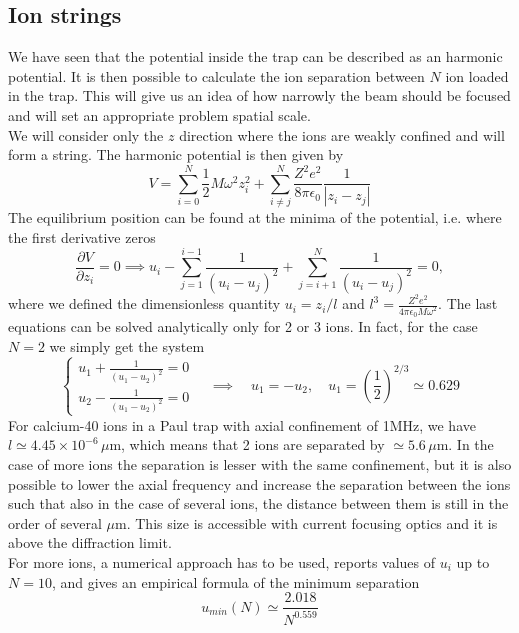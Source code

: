 \subsection{Ion strings}
We have seen that the potential inside the trap can be described as an harmonic potential. It is then possible to calculate the ion separation between $N$ ion loaded in the trap. This will give us an idea of how narrowly the beam should be focused and will set an appropriate problem spatial scale.\\
We will consider only the $z$ direction where the ions are weakly confined and will form a string. The harmonic potential is then given by
\begin{equation}
V = \sum_{i=0}^N \frac{1}{2}M\omega^2z_i^2 + \sum_{i\neq j}^N\frac{Z^2e^2}{8\pi \epsilon_0}\frac{1}{|z_i-z_j|}
\end{equation}
The equilibrium position can be found at the minima of the potential, i.e. where the first derivative zeros
\begin{equation}
\frac{\partial V}{\partial z_i} = 0 \implies u_i - \sum_{j=1}^{i-1} \frac{1}{(u_i-u_j)^2} + \sum_{j= i+1}^{N} \frac{1}{(u_i-u_j)^2}= 0,
\end{equation}
where we defined the dimensionless quantity $u_i = z_i/l$ and $l^3 = \displaystyle\frac{Z^2 e^2 }{4\pi \epsilon_0 M\omega^2}$.
The last equations can be solved analytically only for 2 or 3 ions. In fact, for the case $N=2$ we simply get the system
\begin{equation}
\begin{cases}
  u_1 + \frac{1}{(u_1-u_2)^2} = 0\\
  u_2 - \frac{1}{(u_1-u_2)^2} = 0
  \end{cases} \quad \implies \quad u_1 = -u_2,\quad  u_1 = \left(\frac{1}{2}\right)^{2/3} \simeq 0.629
\end{equation}
For calcium-40 ions in a Paul trap with axial confinement of 1MHz, we have $l \simeq 4.45\times 10^{-6}\, \mu$m, which means that 2 ions are separated by $\simeq 5.6\, \mu$m. In the case of more ions the separation is lesser with the same confinement, but it is also possible to lower the axial frequency and increase the separation between the ions such that also in the case of several ions, the distance between them is still in the order of several $\mu$m. This size is accessible with current focusing optics and it is above the diffraction limit.\\
For more ions, a numerical approach has to be used, \cite{ion_spacing} reports values of $u_i$ up to $N=10$, and gives an empirical formula of the minimum separation
\begin{equation}
u_{min}(N) \simeq \frac{2.018}{N^{0.559}}
\end{equation}
